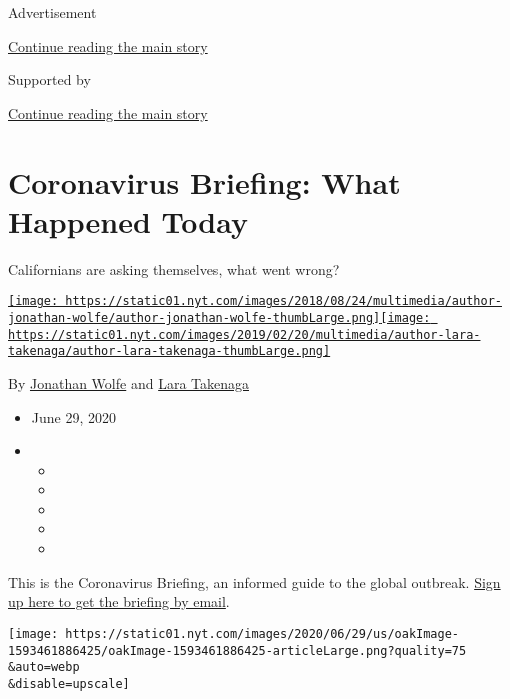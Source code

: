 Advertisement

\protect\hyperlink{after-top}{Continue reading the main story}

Supported by

\protect\hyperlink{after-sponsor}{Continue reading the main story}

\hypertarget{coronavirus-briefing-what-happened-today}{%
\section{Coronavirus Briefing: What Happened
Today}\label{coronavirus-briefing-what-happened-today}}

Californians are asking themselves, what went wrong?

\href{https://www.nytimes.com/by/jonathan-wolfe}{\texttt{[image: https://static01.nyt.com/images/2018/08/24/multimedia/author-jonathan-wolfe/author-jonathan-wolfe-thumbLarge.png]}}\href{https://www.nytimes.com/by/lara-takenaga}{\texttt{[image: https://static01.nyt.com/images/2019/02/20/multimedia/author-lara-takenaga/author-lara-takenaga-thumbLarge.png]}}

By \href{https://www.nytimes.com/by/jonathan-wolfe}{Jonathan Wolfe} and
\href{https://www.nytimes.com/by/lara-takenaga}{Lara Takenaga}

\begin{itemize}
\item
  June 29, 2020
\item
  \begin{itemize}
  \item
  \item
  \item
  \item
  \item
  \end{itemize}
\end{itemize}

This is the Coronavirus Briefing, an informed guide to the global
outbreak.
\href{https://www.nytimes.com/newsletters/coronavirus-briefing}{Sign up
here to get the briefing by email}.

\texttt{[image: https://static01.nyt.com/images/2020/06/29/us/oakImage-1593461886425/oakImage-1593461886425-articleLarge.png?quality=75\\\&auto=webp\\\&disable=upscale]}

